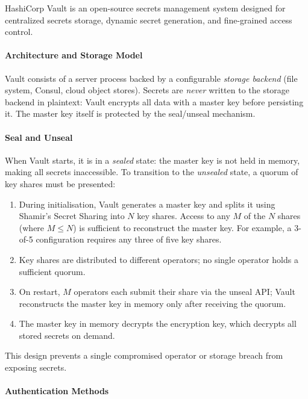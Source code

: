 HashiCorp Vault is an open-source secrets management system designed for centralized secrets storage, dynamic secret generation, and fine-grained access control.

\paragraph{Architecture and Storage Model}

Vault consists of a server process backed by a configurable \emph{storage backend} (file system, Consul, cloud object stores). Secrets are \emph{never} written to the storage backend in plaintext: Vault encrypts all data with a master key before persisting it. The master key itself is protected by the seal/unseal mechanism.

\paragraph{Seal and Unseal}

When Vault starts, it is in a \emph{sealed} state: the master key is not held in memory, making all secrets inaccessible. To transition to the \emph{unsealed} state, a quorum of key shares must be presented:

\begin{enumerate}
    \item During initialisation, Vault generates a master key and splits it using Shamir's Secret Sharing into $N$ key shares. Access to any $M$ of the $N$ shares (where $M \leq N$) is sufficient to reconstruct the master key. For example, a 3-of-5 configuration requires any three of five key shares.
    \item Key shares are distributed to different operators; no single operator holds a sufficient quorum.
    \item On restart, $M$ operators each submit their share via the unseal API; Vault reconstructs the master key in memory only after receiving the quorum.
    \item The master key in memory decrypts the encryption key, which decrypts all stored secrets on demand.
\end{enumerate}

This design prevents a single compromised operator or storage breach from exposing secrets.

\paragraph{Authentication Methods}

